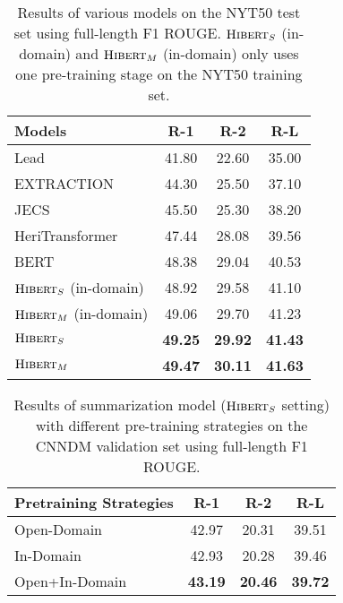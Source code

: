 \documentclass[11pt,a4paper]{article}
\begin{document}
\begin{table}[t]
	\centering
\begin{tabular}[t]{|@{~}l @{~}|@{~}c c c@{~}|}
		\hline
		Models & R-1 & R-2 & R-L \\
		\hline
		\hline
		Lead & 41.80 & 22.60 & 35.00 \\
		EXTRACTION & 44.30 & 25.50 & 37.10 \\
		JECS & 45.50 & 25.30 & 38.20 \\
		
		HeriTransformer & 47.44 & 28.08 & 39.56 \\	
		BERT & 48.38 & 29.04 & 40.53 \\ 
		$\text{\sc Hibert}_S$   (in-domain) & 48.92 & 29.58 & 41.10 \\
		$\text{\sc Hibert}_M$  (in-domain)  & 49.06 & 29.70 & 41.23 \\
		$\text{\sc Hibert}_S$  & {\bf 49.25} & {\bf 29.92} & {\bf 41.43} \\
		$\text{\sc Hibert}_M$  & {\bf 49.47} & {\bf 30.11} & {\bf 41.63} \\
		\hline
	\end{tabular}
	\caption{Results of various models on the NYT50 test set
		using full-length F1 ROUGE. $\text{\sc Hibert}_S$   (in-domain) and $\text{\sc Hibert}_M$  (in-domain) only uses one pre-training stage on the NYT50 training set.}
	\label{tbl:nyt50}
\end{table}


\begin{table}[t]
	\centering
\begin{tabular}[t]{|@{~}l @{~}|@{~}c c c@{~}|}
		\hline
		Pretraining Strategies & R-1 & R-2 & R-L \\
		\hline
		\hline
Open-Domain & 42.97 & 20.31 & 39.51 \\ 
		In-Domain & 42.93 & 20.28 & 39.46 \\
		Open+In-Domain & {\bf 43.19} & {\bf 20.46} & {\bf 39.72} \\
		\hline
	\end{tabular}
	\caption{Results of summarization model ($\text{\sc Hibert}_S$ setting) with different pre-training strategies on the CNNDM validation set using full-length F1 ROUGE.}
	\label{tbl:pretrain}
\end{table}
\end{document}

